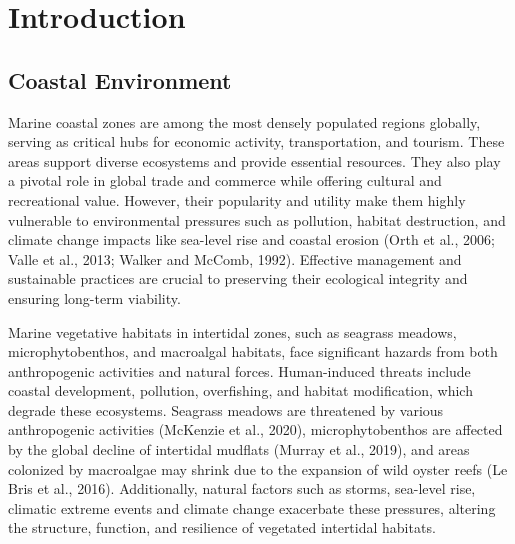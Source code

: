 \documentclass[
  letterpaper,
  11pt,
  english,
  singlespacing,
  headsepline]{MastersDoctoralThesis}
\newcommand{\chaptertopimage}{Chapter1/img/seagrasses.png}
\newcommand{\chapterbottomimage}{Chapter1/img/seagrasses.png}
\begin{document}
\renewcommand{\chaptertopimage}{Chapter1/img/seagrasses.png}
\renewcommand{\chapterbottomimage}{Chapter1/img/fish_farm_psd.png}

\newpage\null\thispagestyle{empty}\newpage


\chapter{Introduction}\label{introduction}

\begin{spacing}{1.5}

\section{Coastal Environment}\label{coastal-environment}

Marine coastal zones are among the most densely populated regions
globally, serving as critical hubs for economic activity,
transportation, and tourism. These areas support diverse ecosystems and
provide essential resources. They also play a pivotal role in global
trade and commerce while offering cultural and recreational value.
However, their popularity and utility make them highly vulnerable to
environmental pressures such as pollution, habitat destruction, and
climate change impacts like sea-level rise and coastal erosion (Orth et
al., 2006; Valle et al., 2013; Walker and McComb, 1992). Effective
management and sustainable practices are crucial to preserving their
ecological integrity and ensuring long-term viability.

Marine vegetative habitats in intertidal zones, such as seagrass
meadows, microphytobenthos, and macroalgal habitats, face significant
hazards from both anthropogenic activities and natural forces.
Human-induced threats include coastal development, pollution,
overfishing, and habitat modification, which degrade these ecosystems.
Seagrass meadows are threatened by various anthropogenic activities
(McKenzie et al., 2020), microphytobenthos are affected by the global
decline of intertidal mudflats (Murray et al., 2019), and areas
colonized by macroalgae may shrink due to the expansion of wild oyster
reefs (Le Bris et al., 2016). Additionally, natural factors such as
storms, sea-level rise, climatic extreme events and climate change
exacerbate these pressures, altering the structure, function, and
resilience of vegetated intertidal habitats.


\end{spacing}
\end{document}
